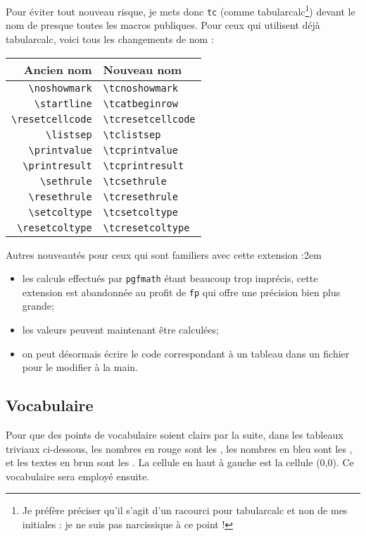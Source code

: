 \documentclass[a4paper,10pt]{article}
\newcommand\guill[1]{\og{}#1\fg{}}
\newcommand\tbcalc{\textsf{tabularcalc}\xspace}
\begin{document}
Pour éviter tout nouveau risque, je mets donc \og\verb-tc-\fg{} (comme \tbcalc\footnote{Je préfère préciser qu'il s'agit d'un racourci pour \tbcalc et non de mes initiales : je ne suis pas narcissique à ce point !}) devant le nom de presque toutes les macros publiques. Pour ceux qui utilisent déjà \tbcalc, voici tous les changements de nom :
\begin{center}
	\begin{tabular}{rl}
		Ancien nom&Nouveau nom \\\hline
		\verb=\noshowmark=&\verb=\tcnoshowmark=\\
		\verb=\startline=&\verb=\tcatbeginrow=\\
		\verb=\resetcellcode=&\verb=\tcresetcellcode=\\
		\verb=\listsep=&\verb=\tclistsep=\\
		\verb=\printvalue=&\verb=\tcprintvalue=\\
		\verb=\printresult=&\verb=\tcprintresult=\\
		\verb=\sethrule=&\verb=\tcsethrule=\\
		\verb=\resethrule=&\verb=\tcresethrule=\\
		\verb=\setcoltype=&\verb=\tcsetcoltype=\\
		\verb=\resetcoltype=&\verb=\tcresetcoltype=
	\end{tabular}
\end{center}

Autres nouveautés pour ceux qui sont familiers avec cette extension :\parindent2em
\begin{itemize}
	\item les calculs effectués par \verb=pgfmath= étant beaucoup trop imprécis, cette extension est abandonnée au profit de \verb=fp= qui offre une précision bien plus grande;
	\item les valeurs peuvent maintenant être calculées;
	\item on peut désormais écrire le code correspondant à un tableau dans un fichier pour le modifier à la main.
\end{itemize}\parindent0pt

\subsection{Vocabulaire}
Pour que des points de vocabulaire soient clairs par la suite, dans les tableaux triviaux ci-dessous, les nombres en rouge sont les \fg{}, les nombres en bleu sont les \fg{}, et les textes en brun sont les \fg{}. La cellule en haut à gauche est la \guill{cellule (0,0)}. Ce vocabulaire sera employé ensuite.
\end{document}
